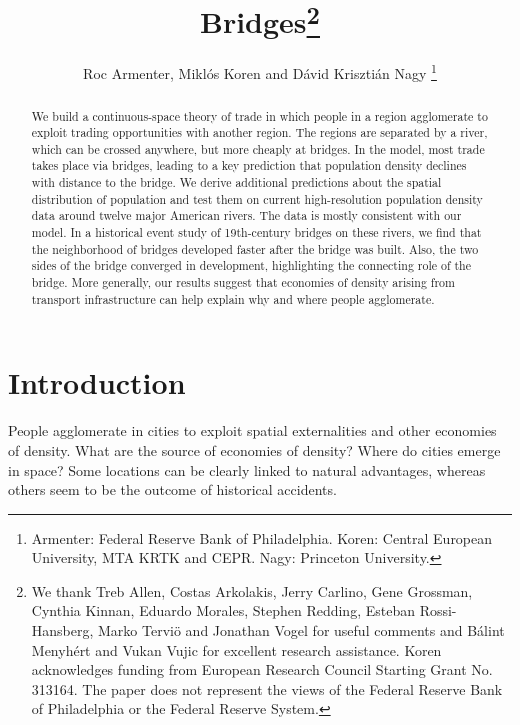 \documentclass[12pt]{article}
\begin{document}
\title{Bridges\thanks{%
We thank Treb Allen, Costas Arkolakis, Jerry Carlino, Gene Grossman, Cynthia Kinnan, Eduardo Morales, Stephen Redding, Esteban Rossi-Hansberg, Marko Terviö and Jonathan Vogel for useful comments and B\'{a}lint Menyh\'{e}rt and Vukan Vujic for excellent research assistance. Koren acknowledges funding from European Research Council Starting Grant No. 313164. The paper does not represent the views of the Federal Reserve Bank of Philadelphia or the Federal Reserve System.}}
\author{Roc Armenter, Mikl\'{o}s Koren and D\'{a}vid Kriszti\'{a}n Nagy%
\thanks{%
Armenter: Federal Reserve Bank of Philadelphia. Koren: Central European
University, MTA KRTK and CEPR. Nagy: Princeton University.}}
\maketitle

\begin{abstract}
We build a continuous-space theory of trade in which people in a region
agglomerate to exploit trading opportunities with another region. The
regions are separated by a river, which can be crossed anywhere, but more
cheaply at bridges. In the model, most trade takes place via bridges,
leading to a key prediction that population density declines with distance
to the bridge. We derive additional predictions about the spatial
distribution of population and test them on current high-resolution population
density data around twelve major American rivers. The data is mostly
consistent with our model. 
In a historical event study of 19th-century bridges on these rivers, we find that the neighborhood of bridges developed faster after the bridge was built. Also, the two sides of the bridge converged in development, highlighting the connecting role of the bridge.
More generally, our results suggest that
economies of density arising from transport infrastructure can help explain
why and where people agglomerate.
\end{abstract}
\newpage
\section{Introduction}

People agglomerate in cities to exploit spatial externalities and other
economies of density. What are the source of economies of density? Where do
cities emerge in space? Some locations can be clearly linked to natural
advantages, whereas others seem to be the outcome of historical accidents.
\end{document}
